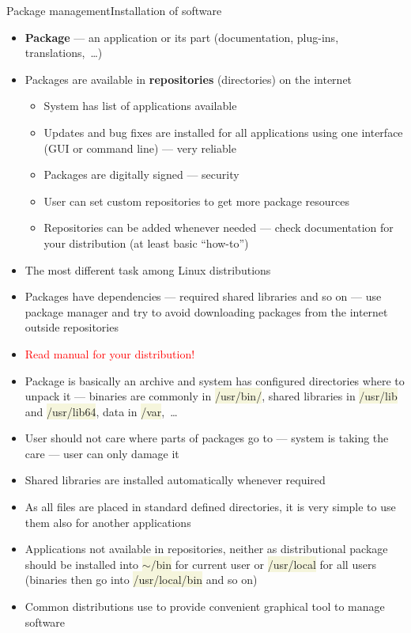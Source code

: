 \documentclass[compress, ucs, xelatex, 11pt, xcolor=svgnames, aspectratio=169,
	hyperref={
		bookmarks=true,
		unicode=true,
		colorlinks=true,
		pdftitle={Linux, command line and MetaCentrum},
		plainpages=false,
		pdfauthor={Vojtech Zeisek},
		pdfsubject={Course about use of Linux command line, writing shell scripts and using MetaCentrum of CESNET},
		pdfcreator={XeLaTeX},
		pdfkeywords={Linux, GNU, BASH, shell, command line, MetaCentrum},
		linkcolor=DarkRed, %
		anchorcolor=DarkBlue, %
		citecolor=Indigo, %
		filecolor=NavyBlue, %
		menucolor=DarkMagenta, %
		urlcolor=DarkBlue, %
		pdftex},
	url={hyphens, lowtilde} %
	]{beamer}
\renewcommand{\texttt}[1]{\colorbox{Beige}{{\ttfamily #1}}}
\renewcommand{\alert}[1]{\textcolor{red}{#1}}
\begin{document}
\begin{frame}[allowframebreaks]{Package management}{Installation of software}
	\begin{itemize}
		\item \textbf{Package} --- an application or its part (documentation, plug-ins, translations,~\ldots)
		\item Packages are available in \textbf{repositories} (directories) on the internet
		\begin{itemize}
			\item System has list of applications available
			\item Updates and bug fixes are installed for all applications using one interface (GUI or command line) --- very reliable
			\item Packages are digitally signed --- security
			\item User can set custom repositories to get more package resources
			\item Repositories can be added whenever needed --- check documentation for your distribution (at least basic \enquote{how-to})
		\end{itemize}
		\item The most different task among Linux distributions
		\item Packages have dependencies --- required shared libraries and so on --- use package manager and try to avoid downloading packages from the internet outside repositories
		\item \alert{Read manual for your distribution!}
		\item Package is basically an archive and system has configured directories where to unpack it --- binaries are commonly in \texttt{/usr/bin/}, shared libraries in \texttt{/usr/lib} and \texttt{/usr/lib64}, data in \texttt{/var},~\ldots
		\item User should not care where parts of packages go to --- system is taking the care --- user can only damage it
		\item Shared libraries are installed automatically whenever required
		\item As all files are placed in standard defined directories, it is very simple to use them also for another applications
		\item Applications not available in repositories, neither as distributional package should be installed into \texttt{$\sim$/bin} for current user or \texttt{/usr/local} for all users (binaries then go into \texttt{/usr/local/bin} and so on)
		\item Common distributions use to provide convenient graphical tool to manage software

\end{itemize}
\end{frame}
\end{document}
